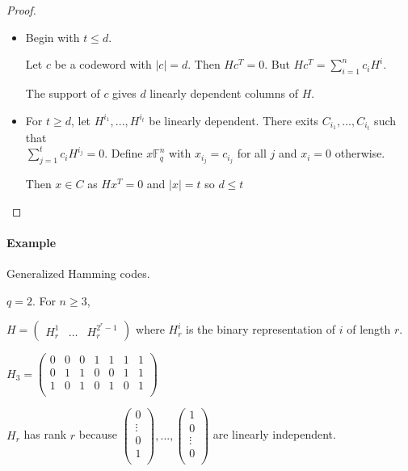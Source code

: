 \documentclass{article}
\begin{document}
\begin{proof}
\begin{itemize}
\item Begin with $t\leq d$.

Let $c$ be a codeword with $|c|=d$. Then $Hc^T = 0$. But $Hc^T = \sum_{i=1}^n c_i H^i$.

The support of $c$ gives $d$ linearly dependent columns of $H$.

\item For $t\geq d$, let $H^{i_1},...,H^{i_t}$ be linearly dependent. There exits $C_{i_1},...,C_{i_t}$ such that \\$\sum_{j=1}^t c_i H^{i_j}=0$. Define $x\mathbb{F}_q^n$ with $x_{i_j}=c_{i_j}$ for all $j$ and $x_i=0$ otherwise.

Then $x\in C$ as $Hx^T=0$ and $|x|=t$ so $d\leq t$
\end{itemize}
\end{proof}

\paragraph{Example} Generalized Hamming codes.

$q=2$. For $n\geq 3$,

$H = 
\begin{pmatrix}
H_r^1 & \hdots & H_r^{2^r - 1}
\end{pmatrix}
$ where $H_r^i$ is the binary representation of $i$ of length $r$.

$H_3=
\begin{pmatrix}
0 & 0 & 0 & 1 & 1 & 1 & 1\\
0 & 1 & 1 & 0 & 0 & 1 & 1\\
1 & 0 & 1 & 0 & 1 & 0 & 1\\
\end{pmatrix}
$

$H_r$ has rank $r$ because $\begin{pmatrix}
0\\
\vdots\\
0\\
1\\
\end{pmatrix},
... ,
\begin{pmatrix}
1\\
0\\
\vdots\\
0\\
\end{pmatrix}
$ are linearly independent.
\end{document}
